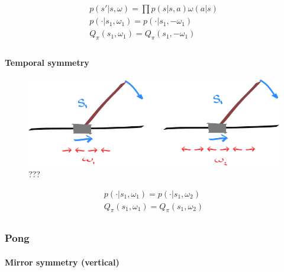 \begin{align}
p(s'|s, \omega) = \prod p(s|s, a)\omega(a|s) \\
p(\cdot|s_1, \omega_1) = p(\cdot|s_1, -\omega_1) \\
Q_{\pi}(s_1, \omega_1) = Q_{\pi}(s_1,-\omega_1) \\
\end{align}

\hypertarget{temporal-symmetry}{%
\paragraph{Temporal symmetry}\label{temporal-symmetry}}

\begin{figure}
\centering
\includegraphics[width=1\textwidth,height=0.25\textheight]{../../pictures/drawings/cart-pole-temporal-approx.png}
\caption{???}
\end{figure}

\begin{align}
p(\cdot|s_1, \omega_1) = p(\cdot|s_1, \omega_2) \\
Q_{\pi}(s_1, \omega_1) = Q_{\pi}(s_1,\omega_2) \\
\end{align}

\hypertarget{pong}{%
\subsubsection{Pong}\label{pong}}

\hypertarget{mirror-symmetry-vertical}{%
\paragraph{Mirror symmetry (vertical)}\label{mirror-symmetry-vertical}}

